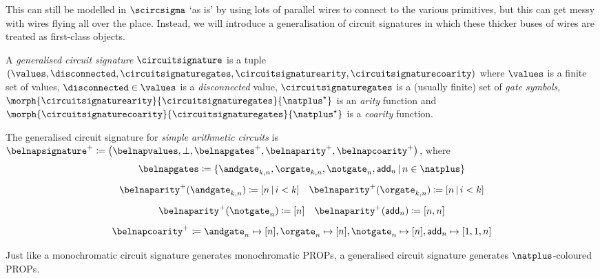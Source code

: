 This can still be modelled in \(\scircsigma\) `as is' by using lots of parallel
wires to connect to the various primitives, but this can get messy with wires
flying all over the place.
Instead, we will introduce a generalisation of circuit signatures in which these
thicker buses of wires are treated as first-class objects.

\begin{definition}
    A \emph{generalised circuit signature} \(\circuitsignature\) is a tuple \((
    \values,
    \disconnected,
    \circuitsignaturegates,
    \circuitsignaturearity,
    \circuitsignaturecoarity
    )\) where \(\values\) is a finite set of values, \(
    \disconnected \in \values
    \) is a \emph{disconnected} value, \(\circuitsignaturegates\) is a (usually
    finite) set of \emph{gate symbols}, \(
    \morph{\circuitsignaturearity}{\circuitsignaturegates}{\natplus^\star}
    \) is an \emph{arity} function and \(
    \morph{\circuitsignaturecoarity}{\circuitsignaturegates}{\natplus^\star}
    \) is a \emph{coarity} function.
\end{definition}

\begin{example}
    The generalised circuit signature for \emph{simple arithmetic circuits} is
    \(
    \belnapsignature^+ \coloneqq \left(
    \belnapvalues,
    \bot,
    \belnapgates^+,
    \belnaparity^+,
    \belnapcoarity^+
    \right)
    \), where \begin{gather*}
        \belnapgates
        \coloneqq \{
        \andgate_{k,n},
        \orgate_{k,n},
        \notgate_{n},
        \mathsf{add}_n
        \,|\,
        n \in \natplus
        \}
        \\[0.5em]
        \belnaparity^+(\andgate_{k,n}) \coloneqq [n \,|\, i < k]
        \quad
        \belnaparity^+(\orgate_{k,n}) \coloneqq [n \,|\, i < k]
        \\[0.5em]
        \belnaparity^+(\notgate_{n}) \coloneqq [n]
        \quad
        \belnaparity^+(\mathsf{add}_n) \coloneqq [n,n]
        \\[0.5em]
        \belnapcoarity^+
        \coloneqq
        \andgate_n \mapsto [n],
        \orgate_n \mapsto [n],
        \notgate_n \mapsto [n],
        \mathsf{add}_n \mapsto [1,1,n]
    \end{gather*}
\end{example}

Just like a monochromatic circuit signature generates monochromatic PROPs, a
generalised circuit signature generates \(\natplus\)-coloured PROPs.

